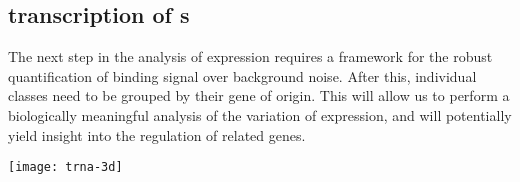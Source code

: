 \subsection{ transcription of s}

The next step in the analysis of \transsine expression requires a framework for
the robust quantification of  binding signal over background noise. After
this, individual \transsine classes need to be grouped by their \rna gene of
origin. This will allow us to perform a biologically meaningful analysis of
the variation of expression, and will potentially yield insight into the
regulation of related \trna genes.

\clearpage

\begin{center}
    \vspace*{\fill}
    \texttt{[image: trna-3d]}
    \vspace*{\fill}
\end{center}
